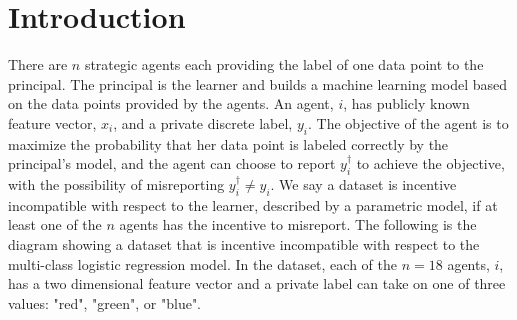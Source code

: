 \documentclass{article}
\begin{document}
\section{Introduction} 
There are $n $ strategic agents each providing the label of one data point to the principal. The principal is the learner and builds a machine learning model based on the data points provided by the agents. An agent, $i $, has publicly known feature vector, $x_{i}$, and a private discrete label, $y_{i}$. The objective of the agent is to maximize the probability that her data point is labeled correctly by the principal's model, and the agent can choose to report $y^{\dagger}_{i}$ to achieve the objective, with the possibility of misreporting $y^{\dagger}_{i} \neq  y_{i}$. We say a dataset is incentive incompatible with respect to the learner, described by a parametric model, if at least one of the $n $ agents has the incentive to misreport.
\newline \newline
The following is the diagram showing a dataset that is incentive incompatible with respect to the multi-class logistic regression model. In the dataset, each of the $n  = 18$ agents, $i $, has a two dimensional feature vector and a private label can take on one of three values: "red", "green", or "blue".
\newline \newline
\end{document}
